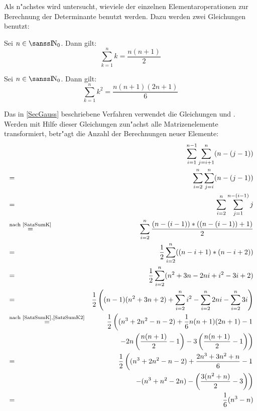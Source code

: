 Als n"achstes wird untersucht, wieviele der einzelnen Elementaroperationen
zur Berechnung der Determinante benutzt werden. Dazu werden zwei 
Gleichungen benutzt:

\begin{bemerkung}
\label{SatzSumK}
    Sei $n \in \Nat_0$. Dann gilt:
    \[ \sum_{k=1}^n k = \frac{ n(n+1) }{ 2 } \]
\end{bemerkung}

\begin{bemerkung}
\label{SatzSumK2}
    Sei $n \in \Nat_0$. Dann gilt:
    \[ \sum_{k=1}^n k^2 = \frac{ n(n+1)(2n+1) }{ 6 } \]
\end{bemerkung}

Das in \ref{SecGauss} beschriebene Verfahren verwendet die Gleichungen
 und . Werden mit Hilfe dieser 
Gleichungen zun"achst alle Matrizenelemente transformiert, betr"agt 
die Anzahl der Berechnungen neuer Elemente:
\begin{eqnarray*}
   &   & \sum_{i=1}^{n-1} \sum_{j=i+1}^n (n-(j-1)) \\
   & = & \sum_{i=2}^n \sum_{j=i}^n (n-(j-1)) \\
   & = & \sum_{i=2}^n \sum_{j=1}^{n-(i-1)} j \\
   & \stackrel{ \mbox{\scriptsize\rm nach \ref{SatzSumK}} }{ = } &
         \sum_{i=2}^n \frac{ (n-(i-1))*((n-(i-1))+1) }{2} \\
   & = & \frac{1}{2} \sum_{i=2}^n ((n-i+1)*(n-i+2)) \\
   & = & \frac{1}{2} \sum_{i=2}^n (n^2+3n-2ni+i^2-3i+2) \\
   & = & \frac{1}{2}
         \left( (n-1)(n^2+3n+2)
             + \sum_{i=2}^n i^2
             - \sum_{i=2}^n 2ni
             - \sum_{i=2}^n 3i
         \right) \\
   & \stackrel{ \mbox{\scriptsize\rm nach \ref{SatzSumK},\ref{SatzSumK2}} }{ = } &
         \frac{1}{2}
         \left( (n^3+2n^2-n-2)
             + \frac{1}{6} n(n+1)(2n+1) - 1 \right. \\
   & &   \left.
             - 2n \left(\frac{ n(n+1) }{ 2 } - 1 \right)
             - 3 \left( \frac{ n(n+1) }{ 2 } - 1 \right)
         \right) \\
   & = &
          \frac{1}{2}
          \left( (n^3+2n^2-n-2)
              + \frac{ 2n^3+3n^2+n }{ 6 } - 1 \right. \\
   & &   \left.
              - ( n^3+n^2 - 2n)
              - \left( \frac{ 3(n^2+n) }{ 2 } - 3 \right)
          \right) \\
   & = & \frac{1}{6}( n^3- n)
\end{eqnarray*}
